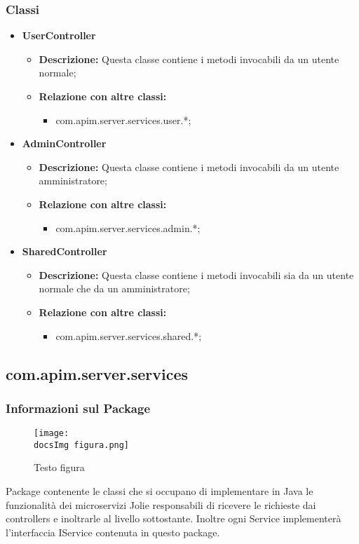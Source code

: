 {{        \subsubsection{Classi}
        \begin{itemize} \itemsep1pt
        \item \textbf{UserController}
        \begin{itemize}
        \item \textbf{Descrizione:} Questa classe contiene i metodi invocabili da un utente normale;
        \item \textbf{Relazione con altre classi:}
        \begin{itemize}
        \item com.apim.server.services.user.*;
        \end{itemize}
        \end{itemize}
        \item \textbf{AdminController}
        \begin{itemize}
        \item \textbf{Descrizione:} Questa classe contiene i metodi invocabili da un utente amministratore;
        \item \textbf{Relazione con altre classi:}
        \begin{itemize}
        \item com.apim.server.services.admin.*;
        \end{itemize}
        \end{itemize}
        \item \textbf{SharedController}
        \begin{itemize}
        \item \textbf{Descrizione:} Questa classe contiene i metodi invocabili sia da un utente normale che da un amministratore;
        \item \textbf{Relazione con altre classi:}
        \begin{itemize}
        \item com.apim.server.services.shared.*;
        \end{itemize}
        \end{itemize}
        \end{itemize}
  }
  \subsection{com.apim.server.services}{
    \subsubsection{Informazioni sul Package}
     \begin{figure}[ht]
       \centering
       \texttt{[image: \\docsImg figura.png]}
       \caption{Testo figura}
       \label{Testo figura}
     \end{figure}
     Package contenente le classi che si occupano di implementare in Java le funzionalità dei microservizi Jolie responsabili di ricevere le richieste dai controllers e inoltrarle al livello sottostante. Inoltre ogni Service implementerà l'interfaccia IService contenuta in questo package.
}}

